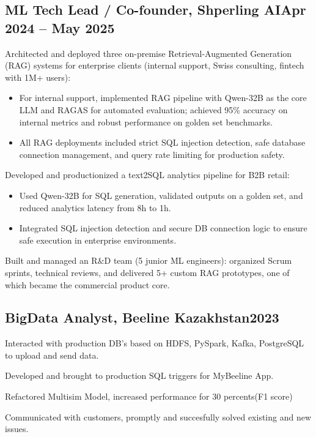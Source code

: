 \documentclass[a4paper,12pt]{article}
\begin{document}


\subsection{{ML Tech Lead / Co-founder, Shperling AI}\hfill Apr 2024 -- May 2025}
\begin{zitemize}
    \item Architected and deployed three on-premise Retrieval-Augmented Generation (RAG) systems for enterprise clients (internal support, Swiss consulting, fintech with 1M+ users):
    \begin{itemize}
        \item For internal support, implemented RAG pipeline with Qwen-32B as the core LLM and RAGAS for automated evaluation; achieved 95\% accuracy on internal metrics and robust performance on golden set benchmarks.
        \item All RAG deployments included strict SQL injection detection, safe database connection management, and query rate limiting for production safety.
    \end{itemize}
    \item Developed and productionized a text2SQL analytics pipeline for B2B retail:
    \begin{itemize}
        \item Used Qwen-32B for SQL generation, validated outputs on a golden set, and reduced analytics latency from 8h to 1h.
        \item Integrated SQL injection detection and secure DB connection logic to ensure safe execution in enterprise environments.
    \end{itemize}
    \item Built and managed an R&D team (5 junior ML engineers): organized Scrum sprints, technical reviews, and delivered 5+ custom RAG prototypes, one of which became the commercial product core.
\end{zitemize}



\subsection{{BigData Analyst, Beeline Kazakhstan}\hfill 2023}
\begin{zitemize}
\item Interacted with production DB's based on HDFS, PySpark, Kafka, PostgreSQL to upload and send data.
\item Developed and brought to production SQL triggers for MyBeeline App.
\item Refactored  Multisim Model, increased performance for 30 percents(F1 score)
\item Communicated with customers, promptly and succesfully solved existing and new issues.
\end{zitemize}
\end{document}
